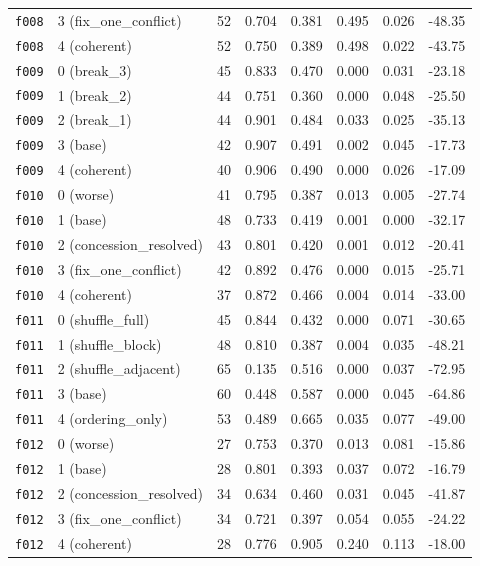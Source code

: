 \documentclass[11pt]{article}
\begin{document}
\begin{table}[htbp]
\begin{tabular}{llrrrrrr}
\texttt{f008} & 3 (fix\_one\_conflict) & 52 & 0.704 & 0.381 & 0.495 & 0.026 & -48.35 \\
\texttt{f008} & 4 (coherent) & 52 & 0.750 & 0.389 & 0.498 & 0.022 & -43.75 \\
\midrule
\texttt{f009} & 0 (break\_3) & 45 & 0.833 & 0.470 & 0.000 & 0.031 & -23.18 \\
\texttt{f009} & 1 (break\_2) & 44 & 0.751 & 0.360 & 0.000 & 0.048 & -25.50 \\
\texttt{f009} & 2 (break\_1) & 44 & 0.901 & 0.484 & 0.033 & 0.025 & -35.13 \\
\texttt{f009} & 3 (base) & 42 & 0.907 & 0.491 & 0.002 & 0.045 & -17.73 \\
\texttt{f009} & 4 (coherent) & 40 & 0.906 & 0.490 & 0.000 & 0.026 & -17.09 \\
\midrule
\texttt{f010} & 0 (worse) & 41 & 0.795 & 0.387 & 0.013 & 0.005 & -27.74 \\
\texttt{f010} & 1 (base) & 48 & 0.733 & 0.419 & 0.001 & 0.000 & -32.17 \\
\texttt{f010} & 2 (concession\_resolved) & 43 & 0.801 & 0.420 & 0.001 & 0.012 & -20.41 \\
\texttt{f010} & 3 (fix\_one\_conflict) & 42 & 0.892 & 0.476 & 0.000 & 0.015 & -25.71 \\
\texttt{f010} & 4 (coherent) & 37 & 0.872 & 0.466 & 0.004 & 0.014 & -33.00 \\
\midrule
\texttt{f011} & 0 (shuffle\_full) & 45 & 0.844 & 0.432 & 0.000 & 0.071 & -30.65 \\
\texttt{f011} & 1 (shuffle\_block) & 48 & 0.810 & 0.387 & 0.004 & 0.035 & -48.21 \\
\texttt{f011} & 2 (shuffle\_adjacent) & 65 & 0.135 & 0.516 & 0.000 & 0.037 & -72.95 \\
\texttt{f011} & 3 (base) & 60 & 0.448 & 0.587 & 0.000 & 0.045 & -64.86 \\
\texttt{f011} & 4 (ordering\_only) & 53 & 0.489 & 0.665 & 0.035 & 0.077 & -49.00 \\
\midrule
\texttt{f012} & 0 (worse) & 27 & 0.753 & 0.370 & 0.013 & 0.081 & -15.86 \\
\texttt{f012} & 1 (base) & 28 & 0.801 & 0.393 & 0.037 & 0.072 & -16.79 \\
\texttt{f012} & 2 (concession\_resolved) & 34 & 0.634 & 0.460 & 0.031 & 0.045 & -41.87 \\
\texttt{f012} & 3 (fix\_one\_conflict) & 34 & 0.721 & 0.397 & 0.054 & 0.055 & -24.22 \\
\texttt{f012} & 4 (coherent) & 28 & 0.776 & 0.905 & 0.240 & 0.113 & -18.00 \\

\end{tabular}
\end{table}
\end{document}
